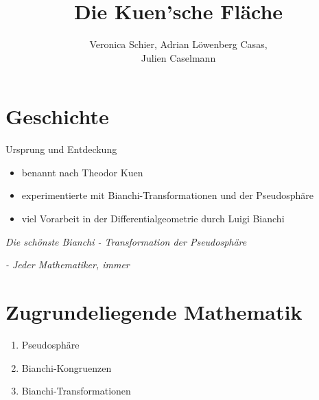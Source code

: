 \documentclass[12pt]{beamer}
\author{Veronica Schier, Adrian Löwenberg Casas, \\Julien Caselmann}
\title{Die Kuen'sche Fläche}
\begin{document}
\begin{frame}
\titlepage
\end{frame}

\begin{frame}

\tableofcontents

\end{frame}

\section{Geschichte}
\begin{frame}{Ursprung und Entdeckung}

\begin{itemize}
\item benannt nach Theodor Kuen 
\item experimentierte mit Bianchi-Transformationen und der Pseudosphäre
\item viel Vorarbeit in der Differentialgeometrie durch Luigi Bianchi \cite{bianchi_wiki}
\end{itemize}

\end{frame}

\begin{frame}

\begin{center}
\textit{\glqq Die schönste Bianchi - Transformation der Pseudosphäre\grqq}
\end{center}

\begin{tiny}
\begin{flushright}
\textit{- Jeder Mathematiker, immer\phantom{aaa}}
\end{flushright}
\end{tiny}

\end{frame}

\section{Zugrundeliegende Mathematik}
\begin{frame}
\begin{enumerate}
\item Pseudosphäre
\item Bianchi-Kongruenzen
\item Bianchi-Transformationen
\end{enumerate}
\end{frame}
\end{document}
